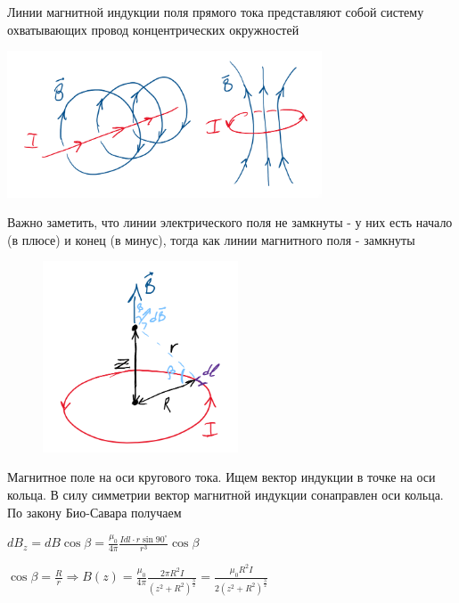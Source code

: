 \documentclass[12pt]{article}
\begin{document}
Линии магнитной индукции поля прямого тока представляют собой систему охватывающих провод концентрических окружностей

\begin{center}
    \includegraphics[width=0.7\textwidth]{physics2/images/physics2_2025_02_10_1}
\end{center}

Важно заметить, что линии электрического поля не замкнуты - у них есть начало (в плюсе) и конец (в минус), тогда 
как линии магнитного поля - замкнуты

\begin{minipage}{\textwidth}
    \begin{figure}
        \includegraphics[width=5.8cm]{physics2/images/physics2_2025_02_10_3}
    \end{figure}

    \Ex Магнитное поле на оси кругового тока. Ищем вектор индукции в точке на оси кольца. 
    В силу симметрии вектор магнитной индукции сонаправлен оси кольца. По закону Био-Савара получаем

    $dB_z = dB \cos \beta = \frac{\mu_0}{4\pi} \frac{Idl \cdot r\sin 90^\circ}{r^3} \cos \beta$

    $\cos \beta = \frac{R}{r} \Longrightarrow B(z) = \frac{\mu_0}{4\pi} \frac{2\pi R^2 I}{(z^2 + R^2)^\frac{3}{2}} = \frac{\mu_0 R^2 I}{2 (z^2 + R^2)^\frac{3}{2}}$
\end{minipage}

\clearpage
\end{document}
